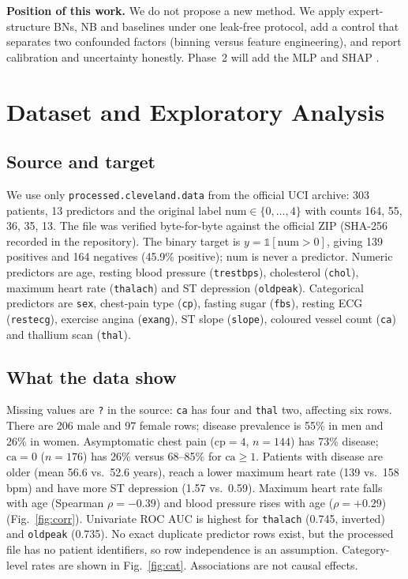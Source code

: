 \documentclass[conference]{IEEEtran}
\begin{document}
\textbf{Position of this work.} We do not propose a new method. We apply expert-structure BNs, NB and baselines under one leak-free protocol, add a control that separates two confounded factors (binning versus feature engineering), and report calibration and uncertainty honestly. Phase~2 will add the MLP \cite{guo2017} and SHAP \cite{lundberg2017}.

\section{Dataset and Exploratory Analysis}
\subsection{Source and target}
We use only \texttt{processed.cleveland.data} from the official UCI archive: 303 patients, 13 predictors and the original label $\mathrm{num}\in\{0,\dots,4\}$ with counts 164, 55, 36, 35, 13. The file was verified byte-for-byte against the official ZIP (SHA-256 recorded in the repository). The binary target is $y=\mathbb{1}[\mathrm{num}>0]$, giving 139 positives and 164 negatives (45.9\% positive); $\mathrm{num}$ is never a predictor. Numeric predictors are age, resting blood pressure (\texttt{trestbps}), cholesterol (\texttt{chol}), maximum heart rate (\texttt{thalach}) and ST depression (\texttt{oldpeak}). Categorical predictors are \texttt{sex}, chest-pain type (\texttt{cp}), fasting sugar (\texttt{fbs}), resting ECG (\texttt{restecg}), exercise angina (\texttt{exang}), ST slope (\texttt{slope}), coloured vessel count (\texttt{ca}) and thallium scan (\texttt{thal}).

\subsection{What the data show}
Missing values are \texttt{?} in the source: \texttt{ca} has four and \texttt{thal} two, affecting six rows. There are 206 male and 97 female rows; disease prevalence is 55\% in men and 26\% in women. Asymptomatic chest pain ($\mathrm{cp}=4$, $n=144$) has 73\% disease; $\mathrm{ca}=0$ ($n=176$) has 26\% versus 68--85\% for $\mathrm{ca}\ge 1$. Patients with disease are older (mean 56.6 vs.\ 52.6 years), reach a lower maximum heart rate (139 vs.\ 158 bpm) and have more ST depression (1.57 vs.\ 0.59). Maximum heart rate falls with age (Spearman $\rho=-0.39$) and blood pressure rises with age ($\rho=+0.29$) (Fig.~\ref{fig:corr}). Univariate ROC AUC is highest for \texttt{thalach} (0.745, inverted) and \texttt{oldpeak} (0.735). No exact duplicate predictor rows exist, but the processed file has no patient identifiers, so row independence is an assumption. Category-level rates are shown in Fig.~\ref{fig:cat}. Associations are not causal effects.
\end{document}
